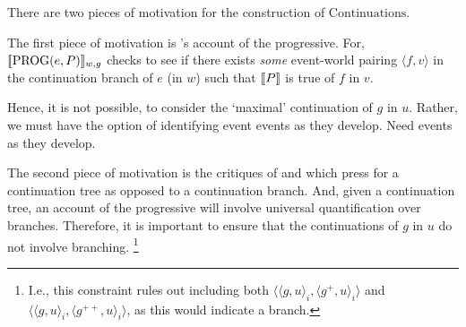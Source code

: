 \begin{note}
  There are two pieces of motivation for the construction of \(\text{Continuations}\).

  The first piece of motivation is \citeauthor{Landman:1992wh}'s account of the progressive.
  For, \(\sem{\text{PROG}(e, P)}_{w,g}\) checks to see if there exists \emph{some} event-world pairing \(\langle f,v \rangle\) in the continuation branch of \(e\) (in \(w\)) such that \(\sem{P}\) is true of \(f\) in \(v\).

  Hence, it is not possible, to consider the `maximal' continuation of \(g\) in \(u\).
  Rather, we must have the option of identifying event events as they develop.
  Need events as they develop.

  The second piece of motivation is the critiques of \textcite{Bonomi:1997uq} and \textcite{Szabo:2004ul} which press for a continuation tree as opposed to a continuation branch.
  And, given a continuation tree, an account of the progressive will involve universal quantification over branches.
  Therefore, it is important to ensure that the continuations of \(g\) in \(u\) do not involve branching.%
  \footnote{
    I.e., this constraint rules out including both \(\langle \langle g,u \rangle_{i}, \langle g^{+},u \rangle_{i} \rangle\) and \(\langle \langle g,u \rangle_{i}, \langle g^{++},u \rangle_{i} \rangle\), as this would indicate a branch.
  }
\end{note}


